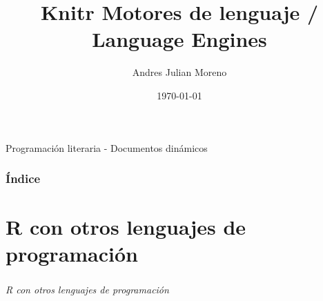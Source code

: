 \documentclass[11pt]{beamer}					%
\title{Knitr Motores de lenguaje / Language Engines}
\author{Andres Julian Moreno}
\institute[UD]{Universidad Distrital Francisco José de Caldas}
\date{\today}
\begin{document}
	
	
	\begin{frame}[fragile]							%
		\titlepage 
		\begin{small}
			Programación literaria - Documentos dinámicos
		\end{small}
	\end{frame}	

    	\begin{frame}[fragile]							%
		\frametitle{Índice}	
		\tableofcontents
	\end{frame}	

\section{R con otros lenguajes de programación}
		 \begin{frame}[fragile]						%
			\frametitle{}
			\begin{huge}
			\begin{center}
				\emph{\textit{R con otros lenguajes de programación}}
			\end{center}
			\end{huge}
		\end{frame}	
\end{document}

